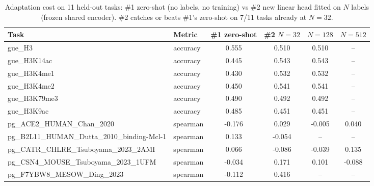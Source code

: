 \begin{table}[t]
\centering
\caption{Adaptation cost on 11 held-out tasks: \#1 zero-shot (no labels, no training) vs \#2 new linear head fitted on $N$ labels (frozen shared encoder). \#2 catches or beats \#1's zero-shot on 7/11 tasks already at $N{=}32$.}
\label{tab:adapt}
\footnotesize
\begin{tabular}{llcccc}
\toprule
Task & Metric & \#1 zero-shot & \#2 $N{=}32$ & $N{=}128$ & $N{=}512$ \\
\midrule
gue\_H3 & accuracy & 0.555 & 0.510 & 0.510 & -- \\
gue\_H3K14ac & accuracy & 0.445 & 0.543 & 0.543 & -- \\
gue\_H3K4me1 & accuracy & 0.430 & 0.532 & 0.532 & -- \\
gue\_H3K4me2 & accuracy & 0.450 & 0.541 & 0.541 & -- \\
gue\_H3K79me3 & accuracy & 0.490 & 0.492 & 0.492 & -- \\
gue\_H3K9ac & accuracy & 0.485 & 0.451 & 0.451 & -- \\
pg\_ACE2\_HUMAN\_Chan\_2020 & spearman & -0.176 & 0.029 & -0.005 & 0.040 \\
pg\_B2L11\_HUMAN\_Dutta\_2010\_binding-Mcl-1 & spearman & 0.133 & -0.054 & -- & -- \\
pg\_CATR\_CHLRE\_Tsuboyama\_2023\_2AMI & spearman & 0.066 & -0.086 & -0.039 & 0.135 \\
pg\_CSN4\_MOUSE\_Tsuboyama\_2023\_1UFM & spearman & -0.034 & 0.171 & 0.101 & -0.088 \\
pg\_F7YBW8\_MESOW\_Ding\_2023 & spearman & -0.112 & 0.416 & -- & -- \\
\bottomrule
\end{tabular}
\end{table}
